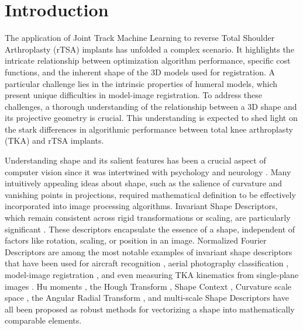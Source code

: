 \section{Introduction}


The application of Joint Track Machine Learning to reverse Total Shoulder Arthroplasty (rTSA) implants has unfolded a complex scenario.
It highlights the intricate relationship between optimization algorithm performance, specific cost functions, and the inherent shape of the 3D models used for registration.
A particular challenge lies in the intrinsic properties of humeral models, which present unique difficulties in model-image registration.
To address these challenges, a thorough understanding of the relationship between a 3D shape and its projective geometry is crucial.
This understanding is expected to shed light on the stark differences in algorithmic performance between total knee arthroplasty (TKA) and rTSA implants.


Understanding shape and its salient features has been a crucial aspect of computer vision since it was intertwined with psychology and neurology \cite{attneaveInformationalAspectsVisual1954,attneaveQuantitativeStudyShape1956}.
Many intuitively appealing ideas about shape, such as the salience of curvature and vanishing points in projections, required mathematical definition to be effectively incorporated into image processing algorithms.
Invariant Shape Descriptors, which remain consistent across rigid transformations or scaling, are particularly significant \cite{zhangReviewShapeRepresentation2004}.
These descriptors encapsulate the essence of a shape, independent of factors like rotation, scaling, or position in an image.
Normalized Fourier Descriptors are among the most notable examples of invariant shape descriptors that have been used for aircraft recognition \cite{wallaceEfficientThreedimensionalAircraft1980,wallaceAnalysisThreedimensionalMovement1980,richardIdentificationThreeDimensionalObjects1974}, aerial photography classification \cite{linClassificationPartial2D1987}, model-image registration \cite{zossoBiplanar2Dto3DRegistration2008}, and even measuring TKA kinematics from single-plane images \cite{banksAccurateMeasurementThreedimensional1996}.
Hu moments \cite{huVisualPatternRecognition1962}, the Hough Transform \cite{ballardGeneralizingHoughTransform1981}, Shape Context \cite{belongieShapeMatchingObject2002}, Curvature scale space \cite{koenderinkSurfaceShapeCurvature1992}, the Angular Radial Transform \cite{leeNewShapeDescription2012}, and multi-scale Shape Descriptors \cite{al-thelayaInShaDeInvariantShape2021} have all been proposed as robust methods for vectorizing a shape into mathematically comparable elements.

